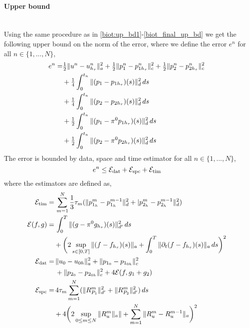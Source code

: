 \paragraph{Upper bound}\mbox{}\\
Using the same procedure as in \eqref{biot:up_bd1}-\eqref{biot_final_up_bd} we get the following upper bound on the norm of the error, where we define the error $e^n$ for all $n \in \{1,...,N\}$,
\begin{align}
e^n = & \tfrac{1}{2}\|u^n - u^n_{h_\tau} \|^2_a + \tfrac{1}{2}\|p_1^n - p^n_{1h_\tau} \|^2_c + \tfrac{1}{2}\|p_2^n - p^n_{2h_\tau} \|^2_c \\
& + \tfrac{1}{4}\int_0^{t_n} \|(p_1 - p_{1h_\tau})(s) \|^2_d \, ds \notag\\
& + \tfrac{1}{4}\int_0^{t_n} \|(p_2 - p_{2h_\tau})(s) \|^2_d \, ds \notag\\
& + \tfrac{1}{2}\int_0^{t_n} \|(p_1 - \pi^0p_{1h_\tau})(s) \|^2_d \, ds \notag\\
& + \tfrac{1}{2}\int_0^{t_n} \|(p_2 - \pi^0p_{2h_\tau})(s) \|^2_d \, ds \notag
\end{align}
The error is bounded by data, space and time estimator for all $n \in \{1,...,N\}$,
\begin{equation}
e^n \leq \mathcal{E}_{\textnormal{dat}} + \mathcal{E}_{\textnormal{spc}} + \mathcal{E}_{\textnormal{tim}} 
\end{equation}
where the estimators are defined as,
\begin{align} \label{bb:est_tim}
\mathcal{E}_{\textnormal{tim}} = & \,\sum_{m=1}^N \frac{1}{3}\tau_m (\|p^m_{1_h} - p^{m-1}_{1_h}\|_d^2 + |p^m_{2_h} - p^{m-1}_{2_h}\|_d^2) \\
\mathcal{E}(f,g) = & \, \int_0^{T}  \|(g-\pi^0 g_{h_\tau})(s)\|^2_{d'} \, ds  \\
& + \biggl( 2 \sup_{s \in [0,T]} \| (f - f_{h_\tau})(s)\|_a + \int_0^{T} \| \partial_t (f - f_{h_\tau})(s)\|_a \, ds \biggr)^2 \notag\\
\mathcal{E}_{\textnormal{dat}} = & \, \|u_0 - u_{0 h} \|^2_a + \|p_{1_0} - p_{1_{0 h}} \|^2_c \label{bb:est_dat}\\
& \, + \|p_{2_0} - p_{2_{0 h}} \|^2_c + 4\mathcal{E}(f, g_1 + g_2) \notag\\
\mathcal{E}_{\textnormal{spc}} = & \, 4 \tau_m\sum_{m=1}^N ( \| R_{P_1}^m\|^2_{d'} + \| R_{P_2}^m\|^2_{d'}) \, ds  \label{bb:est_spc}\\
&+ 4\biggl(2 \sup_{0 \leq m \leq N} \| R_u^m\|_a\| + \sum_{m=1}^N \| R_u^m - R_u^{m-1}\|_a \biggr)^2 \notag
\end{align}
